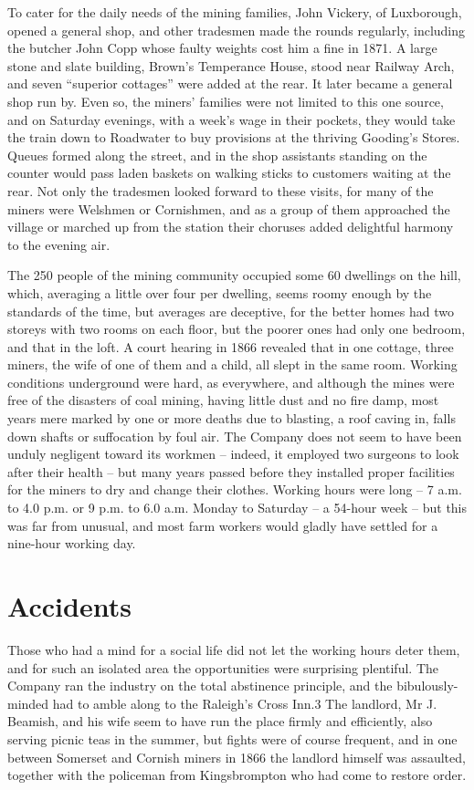 \documentclass[10pt,a4paper]{article}
\begin{document}
To cater for the daily needs of the mining families, John Vickery, of Luxborough, opened a general shop, and other tradesmen made the rounds regularly, including the butcher John Copp whose faulty weights cost him a fine in 1871.  A large stone and slate building, Brown’s Temperance House, stood near Railway Arch, and seven “superior cottages” were added at the rear. It later became a general shop run by. Even so, the miners’ families were not limited to this one source, and on Saturday evenings, with a week’s wage in their pockets, they would take the train down to Roadwater to buy provisions at the thriving Gooding’s Stores. Queues formed along the street, and in the shop assistants standing on the counter would pass laden baskets on walking sticks to customers waiting at the rear. Not only the tradesmen looked forward to these visits, for many of the miners were Welshmen or Cornishmen, and as a group of them approached the village or marched up from the station their choruses added  delightful harmony to the evening air.  

The 250 people of the mining community occupied some 60 dwellings on the hill, which, averaging a little over four per dwelling, seems roomy enough by the standards of the time, but averages are deceptive, for the better homes had two storeys with two rooms on each floor, but the poorer ones had only one bedroom, and that in the loft.  A court hearing in 1866 revealed that in one cottage, three miners, the wife of one of them and a child, all slept in the same room.     Working conditions underground were hard, as everywhere, and although the mines were free of the disasters of coal mining, having little dust and no fire damp, most years mere marked by one or more deaths due to blasting, a roof caving in, falls down shafts or suffocation by foul air. The Company does not seem to have been unduly negligent toward its workmen – indeed, it employed two surgeons to look after their health – but many years passed before they installed proper facilities for the miners to dry and change their clothes. Working hours were long – 7 a.m. to 4.0 p.m. or 9 p.m. to 6.0 a.m.  Monday    to Saturday – a 54-hour week – but this was far from unusual, and most farm workers would gladly have settled for a nine-hour working day.

\section{Accidents}

Those who had a mind for a social life did not let the working hours deter them, and for such an isolated area the opportunities were surprising plentiful. The Company ran the industry on the total abstinence principle, and the bibulously-minded had to amble along to the Raleigh’s Cross Inn.3 The landlord, Mr J. Beamish, and his wife seem to have run the place firmly and efficiently, also serving picnic teas in the summer, but fights were of course frequent, and in one between Somerset and Cornish miners in 1866 the landlord himself was assaulted, together with the policeman from Kingsbrompton who had come to restore order.
\end{document}
